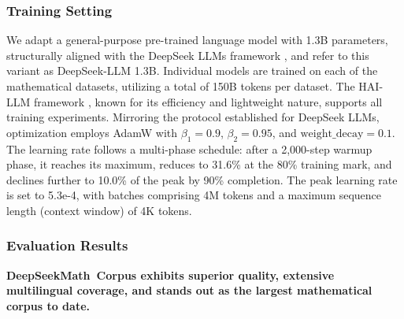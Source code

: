 \subsubsection{Training Setting}
\label{sec:quality-policy}
We adapt a general-purpose pre-trained language model with 1.3B parameters, structurally aligned with the DeepSeek LLMs framework \citep{deepseek-llm}, and refer to this variant as DeepSeek-LLM 1.3B. Individual models are trained on each of the mathematical datasets, utilizing a total of 150B tokens per dataset. The HAI-LLM framework \citep{haillm}, known for its efficiency and lightweight nature, supports all training experiments. Mirroring the protocol established for DeepSeek LLMs, optimization employs AdamW \citep{adamW} with $\beta_1=0.9$, $\beta_2=0.95$, and $\mathrm{weight\_decay}=0.1$. The learning rate follows a multi-phase schedule: after a 2,000-step warmup phase, it reaches its maximum, reduces to 31.6\% at the 80\% training mark, and declines further to 10.0\% of the peak by 90\% completion. The peak learning rate is set to 5.3e-4, with batches comprising 4M tokens and a maximum sequence length (context window) of 4K tokens.

\subsubsection{Evaluation Results}

\textbf{DeepSeekMath~Corpus exhibits superior quality, extensive multilingual coverage, and stands out as the largest mathematical corpus to date.}

